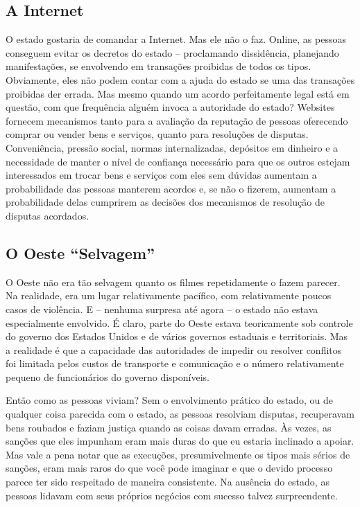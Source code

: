 \subsection*{A Internet}

O estado gostaria de comandar a Internet. Mas ele não o faz. Online, as pessoas conseguem evitar os decretos do estado -- proclamando dissidência, planejando manifestações, se envolvendo em transações proibidas de todos os tipos. Obviamente, eles não podem contar com a ajuda do estado se uma das transações proibidas der errada. Mas mesmo quando um acordo perfeitamente legal está em questão, com que frequência alguém invoca a autoridade do estado? Websites fornecem mecanismos tanto para a avaliação da reputação de pessoas oferecendo comprar ou vender bens e serviços, quanto para resoluções de disputas. Conveniência, pressão social, normas internalizadas, depósitos em dinheiro e a necessidade de manter o nível de confiança necessário para que os outros estejam interessados em trocar bens e serviços com eles sem dúvidas aumentam a probabilidade das pessoas manterem acordos e, se não o fizerem, aumentam a probabilidade delas cumprirem as decisões dos mecanismos de resolução de disputas acordados.

\subsection*{O Oeste ``Selvagem'' }

O Oeste não era tão selvagem quanto os filmes repetidamente o fazem parecer. Na realidade, era um lugar relativamente pacífico, com relativamente poucos casos de violência. E -- nenhuma surpresa até agora -- o estado não estava especialmente envolvido. É claro, parte do Oeste estava teoricamente sob controle do governo dos Estados Unidos e de vários governos estaduais e territoriais. Mas a realidade é que a capacidade das autoridades de impedir ou resolver conflitos foi limitada pelos custos de transporte e comunicação e o número relativamente pequeno de funcionários do governo disponíveis.

Então como as pessoas viviam? Sem o envolvimento prático do estado, ou de qualquer coisa parecida com o estado, as pessoas resolviam disputas, recuperavam bens roubados e faziam justiça quando as coisas davam erradas. Às vezes, as sanções que eles impunham eram mais duras do que eu estaria inclinado a apoiar. Mas vale a pena notar que as execuções, presumivelmente os tipos mais sérios de sanções, eram mais raros do que você pode imaginar e que o devido processo parece ter sido respeitado de maneira consistente. Na ausência do estado, as pessoas lidavam com seus próprios negócios com sucesso talvez surpreendente.

